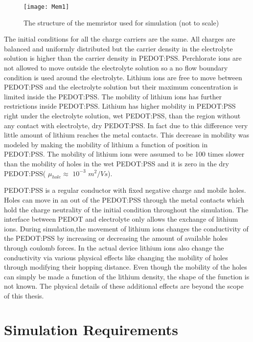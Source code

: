 \begin{doublespace}
\begin{figure}[!htp]
\centering
\texttt{[image: Mem1]}
\caption{The structure of the memristor used for simulation (not to scale)} 
\label{MemStc}
\end{figure}


The initial conditions for all the charge carriers are the same. All charges are balanced and uniformly distributed but the carrier density in the electrolyte solution is higher than the carrier density in PEDOT:PSS. Perchlorate ions are not allowed to move outside the electrolyte solution so a no flow boundary condition is used around the electrolyte. Lithium ions are free to move between PEDOT:PSS and the electrolyte solution but their maximum concentration is limited inside the PEDOT:PSS. The mobility of lithium ions has further restrictions inside PEDOT:PSS. Lithium has higher mobility in PEDOT:PSS right under the electrolyte solution, wet PEDOT:PSS, than the region without any contact with electrolyte, dry PEDOT:PSS. In fact due to this difference very little amount of lithium reaches the metal contacts. This decrease in mobility was modeled by making the mobility of lithium a function of position in PEDOT:PSS. The mobility of lithium ions were assumed to be 100 times slower than the mobility of holes in the wet PEDOT:PSS and it is zero in the dry PEDOT:PSS( $\mu_{hole} \approx$ $10^{-3}$ $m^2/Vs$). 


PEDOT:PSS is a regular conductor with fixed negative charge and mobile holes. Holes can move in an out of the PEDOT:PSS through the metal contacts which hold the charge neutrality of the initial condition throughout the simulation. The interface between PEDOT and electrolyte only allows the exchange of lithium ions. During simulation,the movement of lithium ions changes the conductivity of the PEDOT:PSS by increasing or decreasing the amount of available holes through coulomb forces. In the actual device lithium ions also change the conductivity via various physical effects like changing the mobility of holes through modifying their hopping distance. Even though the mobility of the holes can simply be made a function of the lithium density, the shape of the function is not known. The physical details of these additional effects are beyond the scope of this thesis. 




\clearpage
\section{Simulation Requirements}


\end{doublespace}
